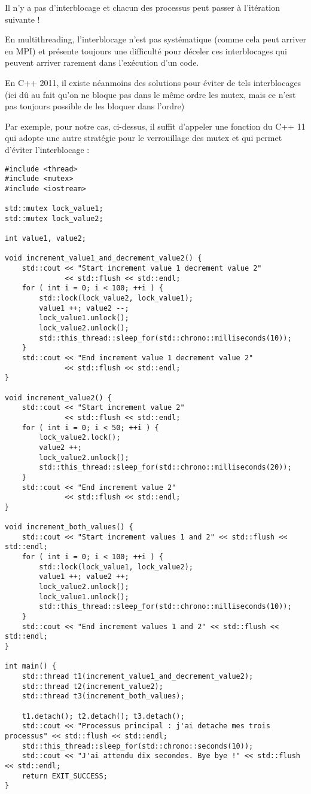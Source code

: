 \documentclass[fleqn,11pt]{article}
\begin{document}
Il n'y a pas d'interblocage et chacun des processus peut passer à l'itération suivante !

En multithreading, l'interblocage n'est pas systématique (comme cela peut arriver en MPI) et présente toujours
une difficulté pour déceler ces interblocages qui peuvent arriver rarement dans l'exécution d'un code.

En C++ 2011, il existe néanmoins des solutions pour éviter de tels interblocages (ici dû au fait qu'on ne bloque pas dans le même ordre les mutex, mais ce n'est pas toujours possible de les bloquer dans l'ordre)

Par exemple, pour notre cas, ci-dessus, il suffit d'appeler une fonction du C++ 11 qui adopte une autre stratégie pour le verrouillage des mutex et qui permet d'éviter l'interblocage :

\begin{lstlisting}
#include <thread>
#include <mutex>
#include <iostream>

std::mutex lock_value1;
std::mutex lock_value2;

int value1, value2;

void increment_value1_and_decrement_value2() {
    std::cout << "Start increment value 1 decrement value 2" 
              << std::flush << std::endl;
    for ( int i = 0; i < 100; ++i ) {
        std::lock(lock_value2, lock_value1);
        value1 ++; value2 --;
        lock_value1.unlock();
        lock_value2.unlock();
        std::this_thread::sleep_for(std::chrono::milliseconds(10));
    }
    std::cout << "End increment value 1 decrement value 2" 
              << std::flush << std::endl;
}

void increment_value2() {
    std::cout << "Start increment value 2" 
              << std::flush << std::endl;
    for ( int i = 0; i < 50; ++i ) {
        lock_value2.lock();
        value2 ++;
        lock_value2.unlock();
        std::this_thread::sleep_for(std::chrono::milliseconds(20));
    }
    std::cout << "End increment value 2" 
              << std::flush << std::endl;
}

void increment_both_values() {
    std::cout << "Start increment values 1 and 2" << std::flush << std::endl;
    for ( int i = 0; i < 100; ++i ) {
        std::lock(lock_value1, lock_value2);
        value1 ++; value2 ++;
        lock_value2.unlock();
        lock_value1.unlock();
        std::this_thread::sleep_for(std::chrono::milliseconds(10));
    }
    std::cout << "End increment values 1 and 2" << std::flush << std::endl;
}

int main() {
    std::thread t1(increment_value1_and_decrement_value2);
    std::thread t2(increment_value2);
    std::thread t3(increment_both_values);

    t1.detach(); t2.detach(); t3.detach();
    std::cout << "Processus principal : j'ai detache mes trois processus" << std::flush << std::endl;
    std::this_thread::sleep_for(std::chrono::seconds(10));
    std::cout << "J'ai attendu dix secondes. Bye bye !" << std::flush << std::endl;
    return EXIT_SUCCESS;
}
\end{lstlisting}
\end{document}
